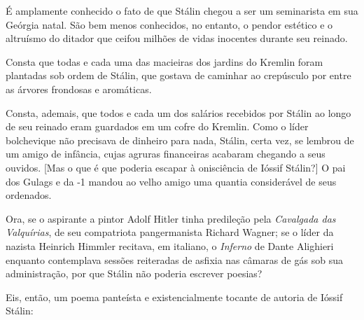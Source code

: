 É amplamente conhecido o fato de que Stálin chegou a ser um seminarista
em sua Geórgia natal. São bem menos conhecidos, no entanto, o pendor
estético e o altruísmo do ditador que ceifou milhões de vidas inocentes
durante seu reinado.

Consta que todas e cada uma das macieiras dos jardins do Kremlin foram
plantadas sob ordem de Stálin, que gostava de caminhar ao crepúsculo por
entre as árvores frondosas e aromáticas.

Consta, ademais, que todos e cada um dos salários recebidos por Stálin
ao longo de seu reinado eram guardados em um cofre do Kremlin. Como o
líder bolchevique não precisava de dinheiro para nada, Stálin, certa
vez, se lembrou de um amigo de infância, cujas agruras financeiras
acabaram chegando a seus ouvidos. {[}Mas o que é que poderia escapar à
onisciência de Ióssif Stálin?{]} O pai dos Gulags e da -1 mandou ao
velho amigo uma quantia considerável de seus ordenados.

Ora, se o aspirante a pintor Adolf Hitler tinha predileção pela
\emph{Cavalgada das Valquírias}, de seu compatriota pangermanista
Richard Wagner; se o líder da  nazista Heinrich Himmler recitava, em
italiano, o \emph{Inferno} de Dante Alighieri enquanto contemplava
sessões reiteradas de asfixia nas câmaras de gás sob sua administração,
por que Stálin não poderia escrever poesias?

Eis, então, um poema panteísta e existencialmente tocante de autoria de
Ióssif Stálin:
\pagebreak

